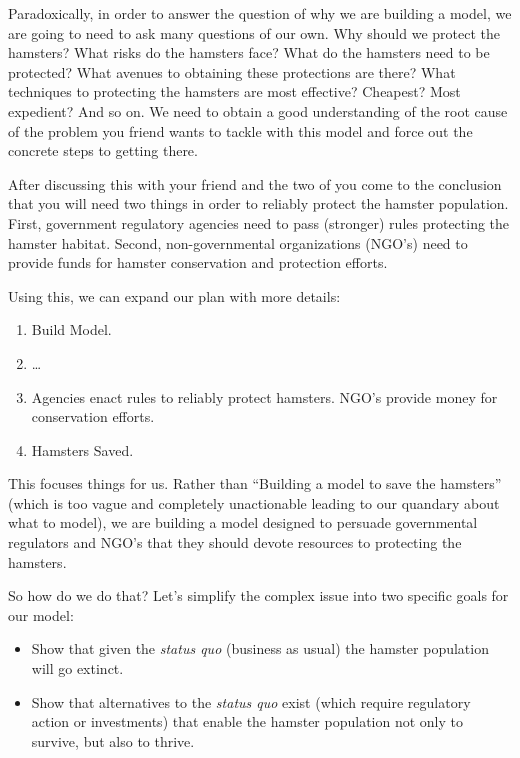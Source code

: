 \documentclass[]{memoir}
\begin{document}
Paradoxically, in order to answer the question of why we are building a
model, we are going to need to ask many questions of our own. Why should
we protect the hamsters? What risks do the hamsters face? What do the
hamsters need to be protected? What avenues to obtaining these
protections are there? What techniques to protecting the hamsters are
most effective? Cheapest? Most expedient? And so on. We need to obtain a
good understanding of the root cause of the problem you friend wants to
tackle with this model and force out the concrete steps to getting
there.

After discussing this with your friend and the two of you come to the
conclusion that you will need two things in order to reliably protect
the hamster population. First, government regulatory agencies need to
pass (stronger) rules protecting the hamster habitat. Second,
non-governmental organizations (NGO's) need to provide funds for hamster
conservation and protection efforts.

Using this, we can expand our plan with more details:

\begin{enumerate}
\def\labelenumi{\arabic{enumi}.}
\itemsep1pt\parskip0pt
\item
  Build Model.
\item
  \ldots{}
\item
  Agencies enact rules to reliably protect hamsters. NGO's provide money
  for conservation efforts.
\item
  Hamsters Saved.
\end{enumerate}

This focuses things for us. Rather than ``Building a model to save the
hamsters'' (which is too vague and completely unactionable leading to
our quandary about what to model), we are building a model designed to
persuade governmental regulators and NGO's that they should devote
resources to protecting the hamsters.

So how do we do that? Let's simplify the complex issue into two specific
goals for our model:

\begin{itemize}
\itemsep1pt\parskip0pt
\item
  Show that given the \emph{status quo} (business as usual) the hamster
  population will go extinct.
\item
  Show that alternatives to the \emph{status quo} exist (which require
  regulatory action or investments) that enable the hamster population
  not only to survive, but also to thrive.
\end{itemize}
\end{document}
